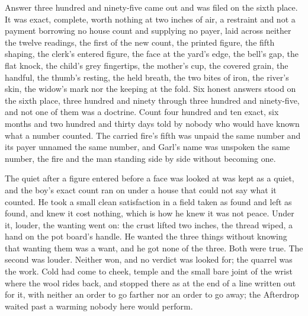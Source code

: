 Answer three hundred and ninety-five came out and was filed on the sixth place. It was exact, complete, worth nothing at two inches of air, a restraint and not a payment borrowing no house count and supplying no payer, laid across neither the twelve readings, the first of the new count, the printed figure, the fifth shaping, the clerk's entered figure, the face at the yard's edge, the bell's gap, the flat knock, the child's grey fingertips, the mother's cup, the covered grain, the handful, the thumb's resting, the held breath, the two bites of iron, the river's skin, the widow's mark nor the keeping at the fold. Six honest answers stood on the sixth place, three hundred and ninety through three hundred and ninety-five, and not one of them was a doctrine. Count four hundred and ten exact, six months and two hundred and thirty days told by nobody who would have known what a number counted. The carried fire's fifth was unpaid the same number and its payer unnamed the same number, and Garl's name was unspoken the same number, the fire and the man standing side by side without becoming one.

The quiet after a figure entered before a face was looked at was kept as a quiet, and the boy's exact count ran on under a house that could not say what it counted. He took a small clean satisfaction in a field taken as found and left as found, and knew it cost nothing, which is how he knew it was not peace. Under it, louder, the wanting went on: the crust lifted two inches, the thread wiped, a hand on the pot board's handle. He wanted the three things without knowing that wanting them was a want, and he got none of the three. Both were true. The second was louder. Neither won, and no verdict was looked for; the quarrel was the work. Cold had come to cheek, temple and the small bare joint of the wrist where the wool rides back, and stopped there as at the end of a line written out for it, with neither an order to go farther nor an order to go away; the Afterdrop waited past a warming nobody here would perform.

